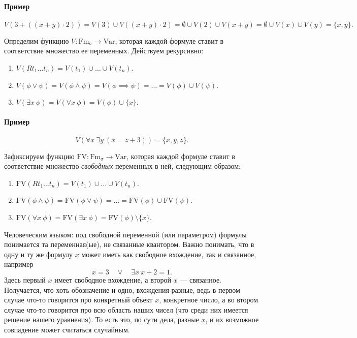 \documentclass[a4paper, fleqn]{article}
\begin{document}
    \paragraph{Пример}
    \[
        V(3 + ((x + y) \cdot 2)) = V(3) \cup V((x + y) \cdot 2) = \emptyset \cup V(2) \cup V(x + y) = \emptyset \cup V(x) \cup V(y) = \{x, y\}.
    \]

    \begin{definition}
        Определим функцию $V \colon \text{Fm}_{\sigma} \to \text{Var}$, которая каждой формуле ставит в 
        соответствие множество ее переменных. Действуем рекурсивно:
        \begin{enumerate}
            \item $V(R t_{1} \ldots t_{n}) = V(t_{1}) \cup \ldots \cup V(t_{n})$.
            \item $V(\phi \lor \psi) = V(\phi \land \psi) = V(\phi \implies \psi) = \ldots = V(\phi) \cup V(\psi)$.
            \item $V(\exists x~\phi) = V(\forall x~\phi) = V(\phi) \cup \{x\}$.
        \end{enumerate}
    \end{definition}

    \paragraph{Пример}
    \[
        V(\forall x~ \exists y~ (x = z + 3)) = \{x, y, z\}.
    \]

    \begin{definition}
        Зафиксируем функцию $\text{FV} \colon \text{Fm}_{\sigma} \to \text{Var}$, которая каждой формуле ставит в 
        соответствие множество {\it свободных} переменных в ней, следующим образом:
        \begin{enumerate}
            \item $\text{FV}(R t_{1} \ldots t_{n}) = V(t_{1}) \cup \ldots \cup V(t_{n})$.
            \item $\text{FV}(\phi \land \psi) =\text{FV}(\phi \lor \psi) = \ldots =\text{FV}(\phi) \cup\text{FV}(\psi)$.
            \item $\text{FV}(\forall x~\phi) =\text{FV}(\exists x~\phi) =\text{FV}(\phi) \setminus \{x\}$.
        \end{enumerate}
    \end{definition}

    Человеческим языком: под свободной переменной (или параметром) формулы понимается та переменная(ые),
    не связанные квантором. Важно понимать, что в одну и ту же формулу $x$ может иметь как свободное 
    вхождение, так и связанное, например
    \[
        x = 3 \quad \lor \quad \exists x~x + 2 = 1.
    \]
    Здесь первый $x$ имеет свободное вхождение, а второй $x$ --- связанное.
    Получается, что хоть обозначение и одно, вхождения разные, ведь в первом случае что-то говорится 
    про конкретный объект $x$, конкретное число, а во втором случае что-то говорится про всю область 
    наших чисел (что среди них имеется решение нашего уравнения).
    То есть это, по сути дела, разные $x$, и их возможное совпадение может считаться случайным.
\end{document}

